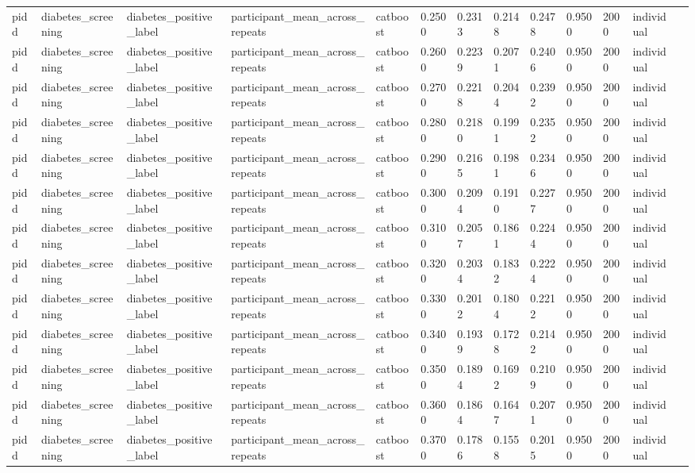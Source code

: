 \begin{tabular}{lllllllllllll}
pidd & diabetes\_screening & diabetes\_positive\_label & participant\_mean\_across\_repeats & catboost & 0.2500 & 0.2313 & 0.2148 & 0.2478 & 0.9500 & 2000 & individual &  \\
pidd & diabetes\_screening & diabetes\_positive\_label & participant\_mean\_across\_repeats & catboost & 0.2600 & 0.2239 & 0.2071 & 0.2406 & 0.9500 & 2000 & individual &  \\
pidd & diabetes\_screening & diabetes\_positive\_label & participant\_mean\_across\_repeats & catboost & 0.2700 & 0.2218 & 0.2044 & 0.2392 & 0.9500 & 2000 & individual &  \\
pidd & diabetes\_screening & diabetes\_positive\_label & participant\_mean\_across\_repeats & catboost & 0.2800 & 0.2180 & 0.1991 & 0.2352 & 0.9500 & 2000 & individual &  \\
pidd & diabetes\_screening & diabetes\_positive\_label & participant\_mean\_across\_repeats & catboost & 0.2900 & 0.2165 & 0.1981 & 0.2346 & 0.9500 & 2000 & individual &  \\
pidd & diabetes\_screening & diabetes\_positive\_label & participant\_mean\_across\_repeats & catboost & 0.3000 & 0.2094 & 0.1910 & 0.2277 & 0.9500 & 2000 & individual &  \\
pidd & diabetes\_screening & diabetes\_positive\_label & participant\_mean\_across\_repeats & catboost & 0.3100 & 0.2057 & 0.1861 & 0.2244 & 0.9500 & 2000 & individual &  \\
pidd & diabetes\_screening & diabetes\_positive\_label & participant\_mean\_across\_repeats & catboost & 0.3200 & 0.2034 & 0.1832 & 0.2224 & 0.9500 & 2000 & individual &  \\
pidd & diabetes\_screening & diabetes\_positive\_label & participant\_mean\_across\_repeats & catboost & 0.3300 & 0.2012 & 0.1804 & 0.2212 & 0.9500 & 2000 & individual &  \\
pidd & diabetes\_screening & diabetes\_positive\_label & participant\_mean\_across\_repeats & catboost & 0.3400 & 0.1939 & 0.1728 & 0.2142 & 0.9500 & 2000 & individual &  \\
pidd & diabetes\_screening & diabetes\_positive\_label & participant\_mean\_across\_repeats & catboost & 0.3500 & 0.1894 & 0.1692 & 0.2109 & 0.9500 & 2000 & individual &  \\
pidd & diabetes\_screening & diabetes\_positive\_label & participant\_mean\_across\_repeats & catboost & 0.3600 & 0.1864 & 0.1647 & 0.2071 & 0.9500 & 2000 & individual &  \\
pidd & diabetes\_screening & diabetes\_positive\_label & participant\_mean\_across\_repeats & catboost & 0.3700 & 0.1786 & 0.1558 & 0.2015 & 0.9500 & 2000 & individual &  \\

\end{tabular}
